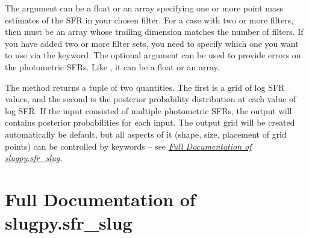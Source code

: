 \documentclass[letterpaper,10pt,english]{sphinxmanual}
\begin{document}
The argument  can be a float or an array specifying one or more point mass estimates of the SFR in your chosen filter. For a case with two or more filters, then  must be an array whose trailing dimension matches the number of filters. If you have added two or more filter sets, you need to specify which one you want to use via the  keyword. The optional argument  can be used to provide errors on the photometric SFRs. Like , it can be a float or an array.

The  method returns a tuple of two quantities. The first is a grid of log SFR values, and the second is the posterior probability distribution at each value of log SFR. If the input consisted of multiple photometric SFRs, the output will contains posterior probabilities for each input. The output grid will be created automatically be default, but all aspects of it (shape, size, placement of grid points) can be controlled by keywords -- see {\hyperref[sfr_slug:sec-sfr-slug-full]{\emph{Full Documentation of slugpy.sfr\_slug}}}.


\section{Full Documentation of slugpy.sfr\_slug}
\label{sfr_slug:sec-sfr-slug-full}\label{sfr_slug:full-documentation-of-slugpy-sfr-slug}
\end{document}
